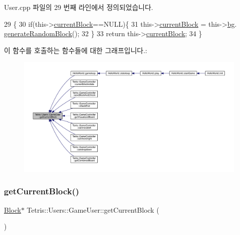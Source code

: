 User.\+cpp 파일의 29 번째 라인에서 정의되었습니다.


\begin{DoxyCode}
29                                         \{
30                      \textcolor{keywordflow}{if}(this->\hyperlink{class_tetris_1_1_users_1_1_game_user_a65c4841efffdf4b6fbe8ac30fb2fb5d1}{currentBlock}==NULL)\{
31                         this->\hyperlink{class_tetris_1_1_users_1_1_game_user_a65c4841efffdf4b6fbe8ac30fb2fb5d1}{currentBlock} = this->\hyperlink{class_tetris_1_1_users_1_1_game_user_ad57a39d1716322764d92ff76f08ebcd5}{bg}.
      \hyperlink{class_tetris_1_1_block_generator_a10dfe1467d40437ad41c5ae76437ad78}{generateRandomBlock}();
32                     \}
33                     \textcolor{keywordflow}{return} this->\hyperlink{class_tetris_1_1_users_1_1_game_user_a65c4841efffdf4b6fbe8ac30fb2fb5d1}{currentBlock};
34                 \}
\end{DoxyCode}
이 함수를 호출하는 함수들에 대한 그래프입니다.\+:
\nopagebreak
\begin{figure}[H]
\begin{center}
\leavevmode
\includegraphics[width=350pt]{d8/d9a/class_tetris_1_1_users_1_1_game_user_a3d4bcc74d518c28356012f8a42b85896_icgraph}
\end{center}
\end{figure}
\mbox{\label{class_tetris_1_1_users_1_1_game_user_a83ae79738da7c0b42fc5e4f4c7016318}} 
\subsubsection{\texorpdfstring{get\+Current\+Block()}{getCurrentBlock()}\hspace{0.1cm}{\footnotesize\ttfamily [2/2]}}
{\footnotesize\ttfamily \hyperlink{class_tetris_1_1_block}{Block}$\ast$ Tetris\+::\+Users\+::\+Game\+User\+::get\+Current\+Block (\begin{DoxyParamCaption}{ }\end{DoxyParamCaption})\hspace{0.3cm}{\ttfamily [inline]}}


